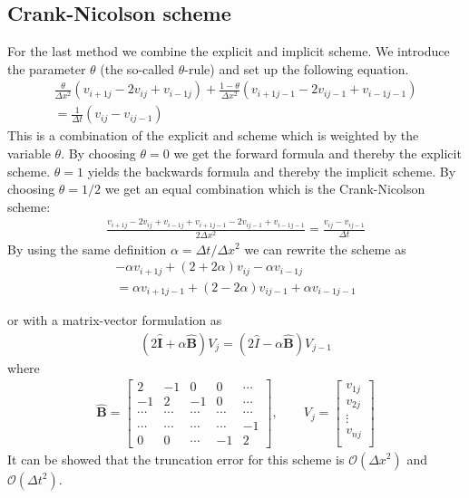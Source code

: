 \documentclass[%
 reprint,
nofootinbib,
aps,
]{revtex4-1}
\renewcommand{\vec}[1]{\mathbf{#1}} %
\begin{document}
\subsection{Crank-Nicolson scheme}
For the last method we combine the explicit and implicit scheme. We introduce the parameter $\theta$  (the so-called $\theta$-rule) and set up the following equation.
\begin{align*}
    \frac{\theta}{\Delta x^2} (v_{i+1j} -2v_{ij} + v_{i-1j}) + \frac{1 - \theta}{\Delta x^2}(v_{i+1j-1} - 2v_{ij-1} + v_{i-1j-1}) \\ = \frac{1}{\Delta t}(v_{ij} - v_{ij-1})
\end{align*}
This is a combination of the explicit and scheme which is weighted by the variable $\theta$. By choosing $\theta = 0$ we get the forward formula and thereby the explicit scheme. $\theta = 1$ yields the backwards formula and thereby the implicit scheme. By choosing $\theta = 1/2$ we get an equal combination which is the Crank-Nicolson scheme:
\begin{align*}
    \frac{v_{i+1j} -2v_{ij} + v_{i-1j} + v_{i+1j-1} - 2v_{ij-1} + v_{i-1j-1} }{2\Delta x^2} = \frac{v_{ij} - v_{ij-1}}{\Delta t}
\end{align*}
By using the same definition $\alpha = \Delta t/\Delta x^2$ we can rewrite the scheme as
\begin{multline}\label{eq:CN}
 -\alpha v_{i+1j} + (2+2\alpha)v_{ij} - \alpha v_{i-1j} \\
    = \alpha v_{i+1j-1} + (2-2\alpha)v_{ij-1} + \alpha v_{i-1j-1}
\end{multline}

or with a matrix-vector formulation as
\begin{align}\label{eq:CNmatrix}
    (2{\hat{\vec{I}}} + \alpha {\hat{\vec{B}}})V_j = (2\hat{I} - \alpha \hat{\vec{B}})V_{j-1}
\end{align}
where
\begin{align*}
    \hat{\vec{B}} = \begin{bmatrix}
                    2 & -1 & 0 & 0 & \cdots \\
                    -1 & 2 & -1 & 0 & \cdots \\
                    \cdots & \cdots & \cdots & \cdots & \cdots \\
                    \cdots & \cdots & \cdots & \cdots & -1 \\
                    0 & 0 & \cdots & -1 & 2
    \end{bmatrix}
     , \qquad V_j =  \begin{bmatrix}
                        v_{1j} \\
                        v_{2j} \\
                        \vdots \\
                        v_{nj} \\
                    \end{bmatrix}
\end{align*}
It can be showed that the truncation error for this scheme is $\mathcal{O}(\Delta x^2)$ and $\mathcal{O}(\Delta t^2)$.
\end{document}
